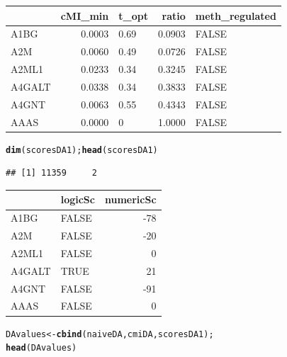 \documentclass[a4paper,10pt]{article}\usepackage[]{graphicx}\usepackage[]{color}
\makeatletter
\newcommand{\hlstd}[1]{\textcolor[rgb]{0.345,0.345,0.345}{#1}}%
\newcommand{\hlkwb}[1]{\textcolor[rgb]{0.69,0.353,0.396}{#1}}%
\newcommand{\hlkwd}[1]{\textcolor[rgb]{0.737,0.353,0.396}{\textbf{#1}}}%
\newenvironment{kframe}{%
 \def\at@end@of@kframe{}%
 \ifinner\ifhmode%
  \def\at@end@of@kframe{\end{minipage}}%
  \begin{minipage}{\columnwidth}%
 \fi\fi%
 \def\FrameCommand##1{\hskip\@totalleftmargin \hskip-\fboxsep
 \colorbox{shadecolor}{##1}\hskip-\fboxsep
     \hskip-\linewidth \hskip-\@totalleftmargin \hskip\columnwidth}%
 \MakeFramed {\advance\hsize-\width
   \@totalleftmargin\z@ \linewidth\hsize
   \@setminipage}}%
 {\par\unskip\endMakeFramed%
 \at@end@of@kframe}
\newenvironment{knitrout}{}{} %
\makeatother
\begin{document}
\begin{knitrout}
\begin{tabular}{l|r|l|r|l}
\hline
  & cMI\_min & t\_opt & ratio & meth\_regulated\\
\hline
A1BG & 0.0003 & 0.69 & 0.0903 & FALSE\\
\hline
A2M & 0.0060 & 0.49 & 0.0726 & FALSE\\
\hline
A2ML1 & 0.0233 & 0.34 & 0.3245 & FALSE\\
\hline
A4GALT & 0.0338 & 0.34 & 0.3833 & FALSE\\
\hline
A4GNT & 0.0063 & 0.55 & 0.4343 & FALSE\\
\hline
AAAS & 0.0000 & 0 & 1.0000 & FALSE\\
\hline
\end{tabular}\begin{kframe}\begin{alltt}
\hlkwd{dim}\hlstd{(scoresDA1);} \hlkwd{head}\hlstd{(scoresDA1)}
\end{alltt}
\begin{verbatim}
## [1] 11359     2
\end{verbatim}
\end{kframe}


\begin{tabular}{l|l|r}
\hline
  & logicSc & numericSc\\
\hline
A1BG & FALSE & -78\\
\hline
A2M & FALSE & -20\\
\hline
A2ML1 & FALSE & 0\\
\hline
A4GALT & TRUE & 21\\
\hline
A4GNT & FALSE & -91\\
\hline
AAAS & FALSE & 0\\
\hline
\end{tabular}\begin{kframe}\begin{alltt}
\hlstd{DAvalues} \hlkwb{<-} \hlkwd{cbind}\hlstd{(naiveDA, cmiDA, scoresDA1);}
\hlkwd{head}\hlstd{(DAvalues)}
\end{alltt}
\end{kframe}



\end{knitrout}
\end{document}
